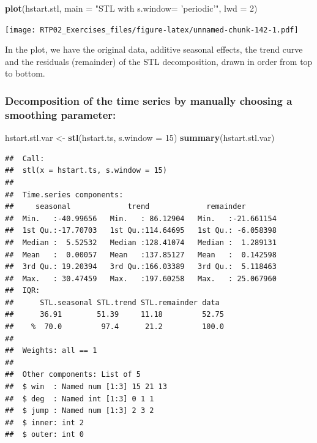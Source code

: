 \documentclass[
]{article}
\newenvironment{Shaded}{\begin{snugshade}}{\end{snugshade}}
\newcommand{\DataTypeTok}[1]{\textcolor[rgb]{0.13,0.29,0.53}{#1}}
\newcommand{\DecValTok}[1]{\textcolor[rgb]{0.00,0.00,0.81}{#1}}
\newcommand{\KeywordTok}[1]{\textcolor[rgb]{0.13,0.29,0.53}{\textbf{#1}}}
\newcommand{\NormalTok}[1]{#1}
\newcommand{\StringTok}[1]{\textcolor[rgb]{0.31,0.60,0.02}{#1}}
\begin{document}
\begin{Shaded}
\begin{Highlighting}[]
\KeywordTok{plot}\NormalTok{(hstart.stl, }\DataTypeTok{main =} \StringTok{"STL with s.window= 'periodic'"}\NormalTok{, }\DataTypeTok{lwd =} \DecValTok{2}\NormalTok{)}
\end{Highlighting}
\end{Shaded}

\texttt{[image: RTP02\_Exercises\_files/figure-latex/unnamed-chunk-142-1.pdf]}

In the plot, we have the original data, additive seasonal effects, the
trend curve and the residuals (remainder) of the STL decomposition,
drawn in order from top to bottom.

\hypertarget{decomposition-of-the-time-series-by-manually-choosing-a-smoothing-parameter}{%
\subsubsection{Decomposition of the time series by manually choosing a
smoothing
parameter:}\label{decomposition-of-the-time-series-by-manually-choosing-a-smoothing-parameter}}

\begin{Shaded}
\begin{Highlighting}[]
\NormalTok{hstart.stl.var <-}\StringTok{ }\KeywordTok{stl}\NormalTok{(hstart.ts, }\DataTypeTok{s.window =} \DecValTok{15}\NormalTok{)}
\KeywordTok{summary}\NormalTok{(hstart.stl.var)}
\end{Highlighting}
\end{Shaded}

\begin{verbatim}
##  Call:
##  stl(x = hstart.ts, s.window = 15)
## 
##  Time.series components:
##     seasonal             trend             remainder         
##  Min.   :-40.99656   Min.   : 86.12904   Min.   :-21.661154  
##  1st Qu.:-17.70703   1st Qu.:114.64695   1st Qu.: -6.058398  
##  Median :  5.52532   Median :128.41074   Median :  1.289131  
##  Mean   :  0.00057   Mean   :137.85127   Mean   :  0.142598  
##  3rd Qu.: 19.20394   3rd Qu.:166.03389   3rd Qu.:  5.118463  
##  Max.   : 30.47459   Max.   :197.60258   Max.   : 25.067960  
##  IQR:
##      STL.seasonal STL.trend STL.remainder data 
##      36.91        51.39     11.18         52.75
##    %  70.0         97.4      21.2         100.0
## 
##  Weights: all == 1
## 
##  Other components: List of 5
##  $ win  : Named num [1:3] 15 21 13
##  $ deg  : Named int [1:3] 0 1 1
##  $ jump : Named num [1:3] 2 3 2
##  $ inner: int 2
##  $ outer: int 0
\end{verbatim}
\end{document}
